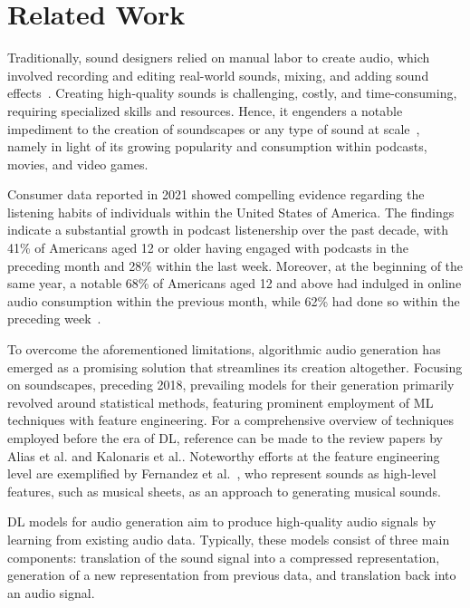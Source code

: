 \section{Related Work} \label{sec:related-work}

Traditionally, sound designers relied on manual labor to create audio, which involved recording and editing real-world sounds, mixing, and adding sound effects~\cite{sonnenschein_sound_2001}. Creating high-quality sounds is challenging, costly, and time-consuming, requiring specialized skills and resources. Hence, it engenders a notable impediment to the creation of soundscapes or any type of sound at scale~\cite{bernardes_seed_2016, strobl_sound_2006}, namely in light of its growing popularity and consumption within podcasts, movies, and video games.

Consumer data reported in 2021 showed compelling evidence regarding the listening habits of individuals within the United States of America. The findings indicate a substantial growth in podcast listenership over the past decade, with 41\% of Americans aged 12 or older having engaged with podcasts in the preceding month and 28\% within the last week. Moreover, at the beginning of the same year, a notable 68\% of Americans aged 12 and above had indulged in online audio consumption within the previous month, while 62\% had done so within the preceding week~\cite{research_infinite_2021}.

To overcome the aforementioned limitations, algorithmic audio generation has emerged as a promising solution that streamlines its creation altogether. Focusing on soundscapes, preceding 2018, prevailing models for their generation primarily revolved around statistical methods, featuring prominent employment of \ac{ML} techniques with feature engineering. For a comprehensive overview of techniques employed before the era of \ac{DL}, reference can be made to the review papers by Alias et al.\cite{alias_review_2016} and Kalonaris et al.\cite{kalonaris_computational_2018}. Noteworthy efforts at the feature engineering level are exemplified by Fernandez et al.~\cite{fernandez_ai_2013}, who represent sounds as high-level features, such as musical sheets, as an approach to generating musical sounds.

\Ac{DL} models for audio generation aim to produce high-quality audio signals by learning from existing audio data. Typically, these models consist of three main components: translation of the sound signal into a compressed representation, generation of a new representation from previous data, and translation back into an audio signal.

